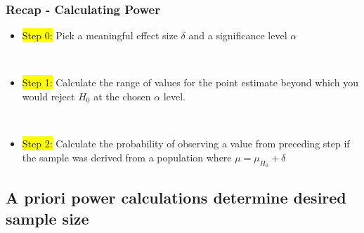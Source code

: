 \documentclass[11pt,containsverbatim,handout,xcolor=xelatex,dvipsnames,table]{beamer}
\begin{document}
\begin{frame}
\frametitle{Recap - Calculating Power}

\begin{itemize}

\item \hl{Step 0:} Pick a meaningful effect size $\delta$ and a significance level $\alpha$

~\\

\item \hl{Step 1:} Calculate the range of values for the point estimate beyond which you would reject $H_0$ at the chosen $\alpha$ level.

~\\

\item \hl{Step 2:} Calculate the probability of observing a value from preceding step if the sample was derived from a population where $\mu = \mu_{H_0}+\delta$

\end{itemize}

\end{frame}



\subsection{A priori power calculations determine desired sample size}
\label{mi6}

\end{document}
